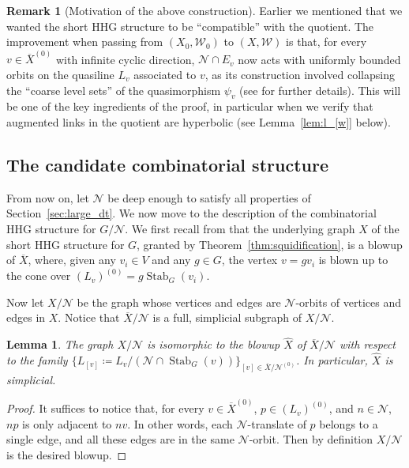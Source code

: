 \documentclass[svgnames]{amsart}
\theoremstyle{plain}
\newtheorem{lemma}[thm]{Lemma}
\theoremstyle{definition}
\newtheorem{rem}[thm]{Remark}
\newcommand{\ov}[1]{\overline{#1}}
\newcommand{\Stab}[2]{\operatorname{Stab}_{#1}(#2)}
\newcommand{\N}{\mathcal{N}}
\newcommand{\W}{\mathcal{W}}
\newcommand{\h}{\widehat}
\begin{document}
\begin{rem}[Motivation of the above construction]\label{rem:weird_flex}
    Earlier we mentioned that we wanted the short HHG structure to be “compatible” with the quotient. The improvement when passing from $(X_0, \W_0)$ to $(X, \W)$ is that, for every $v\in \ov X^{(0)}$ with infinite cyclic direction, $\N\cap E_v$ now acts with uniformly bounded orbits on the quasiline $L_v$ associated to $v$, as its construction involved collapsing the “coarse level sets” of the quasimorphism $\psi_v$ (see \cite[Definition 3.12]{Short_HHG:I} for further details). This will be one of the key ingredients of the proof, in particular when we verify that augmented links in the quotient are hyperbolic (see Lemma~\ref{lem:l_[w]} below).
\end{rem}




\subsection{The candidate combinatorial structure}\label{subsec:X_W_quot}
From now on, let $\N$ be deep enough to satisfy all properties of Section~\ref{sec:large_dt}. We now move to the description of the combinatorial HHG structure for $G/\N$. We first recall from \cite{Short_HHG:I} that the underlying graph $X$ of the short HHG structure for $G$, granted by Theorem~\ref{thm:squidification}, is a blowup of $\ov X$, where, given any $v_i\in V$ and any $g\in G$, the vertex $v=gv_i$ is blown up to the cone over $(L_v)^{(0)}=g\Stab{G}{v_i}$. 

Now let $X/\N$ be the graph whose vertices and edges are $\N$-orbits of vertices and edges in $X$. Notice that $\ov X/\N$ is a full, simplicial subgraph of $X/\N$.

\begin{lemma}\label{lem:blowup_for_quotient}
   The graph $X/\N$ is isomorphic to the blowup $\h X$ of $\ov X/\N$ with respect to the family $\{L_{[v]}\coloneq L_v/(\N\cap\Stab{G}{v})\}_{[v]\in\ov X/\N^{(0)}}$. In particular, $\h X$ is simplicial.
\end{lemma}

\begin{proof} It suffices to notice that, for every $v\in \ov X^{(0)}$, $p\in (L_v)^{(0)}$, and $n\in \N$, $np$ is only adjacent to $nv$. In other words, each $\N$-translate of $p$ belongs to a single edge, and all these edges are in the same $\N$-orbit. Then by definition $X/\N$ is the desired blowup.
\end{proof}
\end{document}
